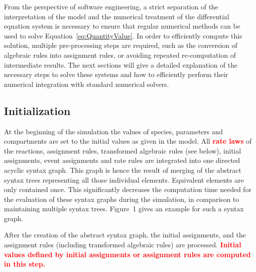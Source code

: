 \documentclass[10pt]{bmc_article}
\newenvironment{bmcformat}{\baselineskip20pt\sloppy\setboolean{publ}{false}}{\baselineskip20pt\sloppy}
\newcommand{\TODO}[1]{\textcolor{red}{\textbf{#1}}}
\begin{document}
\begin{bmcformat}
From the perspective of software engineering, a strict separation of the 
interpretation of the model and the numerical treatment of the differential
equation system is necessary to ensure that regular numerical methods can be used
to solve Equation~\ref{eq:QuantityValue}.
In order to efficiently compute this solution, multiple pre-processing steps are
required, such as the conversion of algebraic rules into assignment rules, or
avoiding repeated re-computation of intermediate results.
The next sections will give a detailed explanation of the necessary steps to
solve these systems and how to efficiently perform their numerical integration
with standard numerical solvers.


\subsection*{Initialization}

At the beginning of the simulation the values of species, parameters and
compartments are set to the initial values as given in the model.
All \TODO{rate laws} of the reactions, assignment rules, transformed algebraic
rules (see below), initial assignments, event assignments and rate rules
are integrated into one directed acyclic syntax graph.
This graph is hence the result of merging of the abstract syntax trees 
representing all those individual elements.
Equivalent elements are only contained once.
This significantly decreases the computation time needed for the
evaluation of these syntax graphs during the simulation, in comparison to
maintaining multiple syntax trees. Figure~1 gives an example for such a syntax
graph.

After the creation of the abstract syntax graph, the initial assignments, and the
assignment rules (including transformed algebraic rules) are processed.
\TODO{Initial values defined by initial assignments or assignment rules are computed in this step.}



\end{bmcformat}
\end{document}
